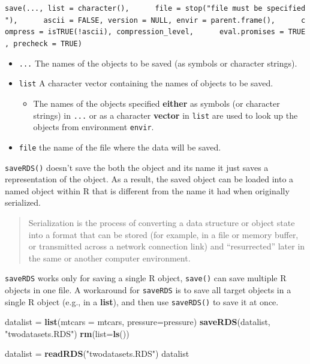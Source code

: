 \documentclass[
]{book}
\newenvironment{Shaded}{\begin{snugshade}}{\end{snugshade}}
\newcommand{\AttributeTok}[1]{\textcolor[rgb]{0.13,0.29,0.53}{#1}}
\newcommand{\FunctionTok}[1]{\textcolor[rgb]{0.13,0.29,0.53}{\textbf{#1}}}
\newcommand{\NormalTok}[1]{#1}
\newcommand{\OtherTok}[1]{\textcolor[rgb]{0.56,0.35,0.01}{#1}}
\newcommand{\StringTok}[1]{\textcolor[rgb]{0.31,0.60,0.02}{#1}}
\providecommand{\tightlist}{%
  \setlength{\itemsep}{0pt}\setlength{\parskip}{0pt}}
\begin{document}
\texttt{save(...,\ list\ =\ character(),\ \ \ \ \ \ file\ =\ stop("\textquotesingle{}file\textquotesingle{}\ must\ be\ specified"),\ \ \ \ \ \ ascii\ =\ FALSE,\ version\ =\ NULL,\ envir\ =\ parent.frame(),\ \ \ \ \ \ compress\ =\ isTRUE(!ascii),\ compression\_level,\ \ \ \ \ \ eval.promises\ =\ TRUE,\ precheck\ =\ TRUE)}

\begin{itemize}
\tightlist
\item
  \texttt{...} The names of the objects to be saved (as symbols or character strings).
\item
  \texttt{list} A character vector containing the names of objects to be saved.

  \begin{itemize}
  \tightlist
  \item
    The names of the objects specified \textbf{either} as symbols (or character strings) in \texttt{...} or as a character \textbf{vector} in \texttt{list} are used to look up the objects from environment \texttt{envir}.
  \end{itemize}
\item
  \texttt{file} the name of the file where the data will be saved.
\end{itemize}

\texttt{saveRDS()} doesn't save the both the object and its name it just saves a representation of the object. As a result, {the saved object can be loaded into a named object} within R that is different from the name it had when originally serialized.

\begin{quote}
Serialization is the process of converting a data structure or object state into a format that can be stored (for example, in a file or memory buffer, or transmitted across a network connection link) and ``resurrected'' later in the same or another computer environment.
\end{quote}

\texttt{saveRDS} works only for {saving a single R object}, \texttt{save()} can save multiple R objects in one file. A workaround for \texttt{saveRDS} is to save all target objects in a single R object (e.g., in a \textbf{list}), and then use \texttt{saveRDS()} to save it at once.

\begin{Shaded}
\begin{Highlighting}[]
\NormalTok{datalist }\OtherTok{=} \FunctionTok{list}\NormalTok{(}\AttributeTok{mtcars =}\NormalTok{ mtcars, }\AttributeTok{pressure=}\NormalTok{pressure)}
\FunctionTok{saveRDS}\NormalTok{(datalist, }\StringTok{"twodatasets.RDS"}\NormalTok{)}
\FunctionTok{rm}\NormalTok{(}\AttributeTok{list=}\FunctionTok{ls}\NormalTok{())}

\NormalTok{datalist }\OtherTok{=} \FunctionTok{readRDS}\NormalTok{(}\StringTok{"twodatasets.RDS"}\NormalTok{)}
\NormalTok{datalist}
\end{Highlighting}
\end{Shaded}
\end{document}
